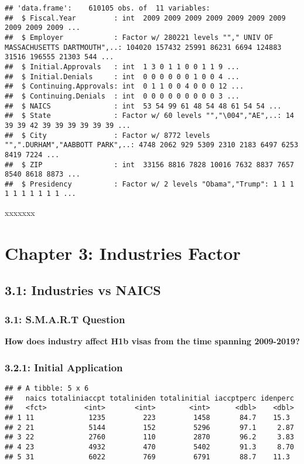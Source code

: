 \documentclass[]{article}
\begin{document}
\begin{verbatim}
## 'data.frame':    610105 obs. of  11 variables:
##  $ Fiscal.Year         : int  2009 2009 2009 2009 2009 2009 2009 2009 2009 2009 ...
##  $ Employer            : Factor w/ 280221 levels ""," UNIV OF MASSACHUSETTS DARTMOUTH",..: 104020 157432 25991 86231 6694 124883 31516 196555 21303 544 ...
##  $ Initial.Approvals   : int  1 3 0 1 1 0 0 1 1 9 ...
##  $ Initial.Denials     : int  0 0 0 0 0 0 1 0 0 4 ...
##  $ Continuing.Approvals: int  0 1 1 0 0 4 0 0 0 12 ...
##  $ Continuing.Denials  : int  0 0 0 0 0 0 0 0 0 3 ...
##  $ NAICS               : int  53 54 99 61 48 54 48 61 54 54 ...
##  $ State               : Factor w/ 60 levels "","\004","AE",..: 14 39 39 42 39 39 39 39 39 39 ...
##  $ City                : Factor w/ 8772 levels "",".DURHAM","AABBOTT PARK",..: 4748 2062 929 5309 2310 2183 6497 6253 8419 7224 ...
##  $ ZIP                 : int  33156 8816 7828 10016 7632 8837 7657 8540 8618 8873 ...
##  $ Presidency          : Factor w/ 2 levels "Obama","Trump": 1 1 1 1 1 1 1 1 1 1 ...
\end{verbatim}

xxxxxxx

\hypertarget{chapter-3-industries-factor}{%
\section{Chapter 3: Industries
Factor}\label{chapter-3-industries-factor}}

\hypertarget{industries-vs-naics}{%
\subsection{3.1: Industries vs NAICS}\label{industries-vs-naics}}

\hypertarget{s.m.a.r.t-question}{%
\subsubsection{3.1: S.M.A.R.T Question}\label{s.m.a.r.t-question}}

\textbf{How does industry affect H1b visas from the time spanning
2009-2019?}

\hypertarget{initial-application}{%
\subsubsection{3.2.1: Initial Application}\label{initial-application}}

\begin{verbatim}
## # A tibble: 5 x 6
##   naics totaliniaccpt totaliniden totalinitial iaccptperc idenperc
##   <fct>         <int>       <int>        <int>      <dbl>    <dbl>
## 1 11             1235         223         1458       84.7    15.3 
## 2 21             5144         152         5296       97.1     2.87
## 3 22             2760         110         2870       96.2     3.83
## 4 23             4932         470         5402       91.3     8.70
## 5 31             6022         769         6791       88.7    11.3
\end{verbatim}
\end{document}
